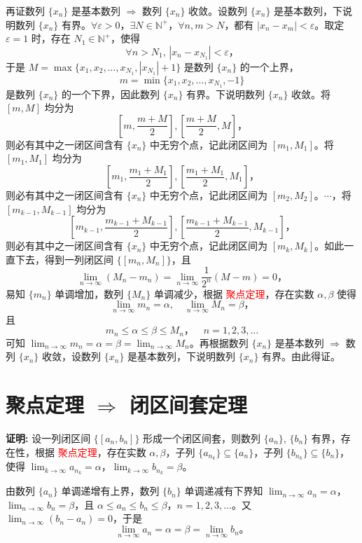 \documentclass[lang=cn,newtx,10pt,scheme=chinese]{elegantbook}
\begin{document}
再证数列 $\{x_n\}$ 是基本数列 $\Rightarrow$ 数列 $\{x_n\}$ 收敛。设数列 $\{x_n\}$ 是基本数列，下说明数列 $\{x_n\}$ 有界。$\forall \varepsilon > 0$，$\exists N \in \mathbb{N}^+$，$\forall n, m > N$，都有 $|x_n - x_m| < \varepsilon$。取定 $\varepsilon = 1$ 时，存在 $N_1 \in \mathbb{N}^+$，使得
\[
\forall n > N_1, \, |x_n - x_{N_1}| < \varepsilon，
\]
于是 $M = \max \{x_1, x_2, \ldots, x_{N_1}, |x_{N_1}| + 1\}$ 是数列 $\{x_n\}$ 的一个上界，
\[
m = \min \{x_1, x_2, \ldots, x_{N_1}, -1\}
\]
是数列 $\{x_n\}$ 的一个下界，因此数列 $\{x_n\}$ 有界。下说明数列 $\{x_n\}$ 收敛。将 $[m, M]$ 均分为
\[
\left[m, \frac{m + M}{2}\right], \left[\frac{m + M}{2}, M\right]，
\]
则必有其中之一闭区间含有 $\{x_n\}$ 中无穷个点，记此闭区间为 $[m_1, M_1]$。将 $[m_1, M_1]$ 均分为
\[
\left[m_1, \frac{m_1 + M_1}{2}\right], \left[\frac{m_1 + M_1}{2}, M_1\right]，
\]
则必有其中之一闭区间含有 $\{x_n\}$ 中无穷个点，记此闭区间为 $[m_2, M_2]$。$\cdots$，将 $[m_{k-1}, M_{k-1}]$ 均分为
\[
\left[m_{k-1}, \frac{m_{k-1} + M_{k-1}}{2}\right], \left[\frac{m_{k-1} + M_{k-1}}{2}, M_{k-1}\right]，
\]
则必有其中之一闭区间含有 $\{x_n\}$ 中无穷个点，记此闭区间为 $[m_k, M_k]$。如此一直下去，得到一列闭区间 $\{[m_n, M_n]\}$，且
\[
\lim_{n \to \infty} (M_n - m_n) = \lim_{n \to \infty} \frac{1}{2^n} (M - m) = 0，
\]
易知 $\{m_n\}$ 单调增加，数列 $\{M_n\}$ 单调减少，根据 \textcolor{red}{聚点定理}，存在实数 $\alpha, \beta$ 使得
\[
\lim_{n \to \infty} m_n = \alpha, \quad \lim_{n \to \infty} M_n = \beta，
\]
且
\[
m_n \leq \alpha \leq \beta \leq M_n， \quad n = 1, 2, 3, \ldots
\]
可知 $\lim_{n \to \infty} m_n = \alpha = \beta = \lim_{n \to \infty} M_n$。再根据数列 $\{x_n\}$ 是基本数列 $\Rightarrow$ 数列 $\{x_n\}$ 收敛，设数列 $\{x_n\}$ 是基本数列，下说明数列 $\{x_n\}$ 有界。由此得证。


\section*{聚点定理 $\Rightarrow$ 闭区间套定理}

\textbf{证明:} 设一列闭区间 $\{[a_n, b_n]\}$ 形成一个闭区间套，则数列 $\{a_n\}$, $\{b_n\}$ 有界，存在性，根据 \textcolor{red}{聚点定理}，存在实数 $\alpha, \beta$，子列 $\{a_{n_k}\} \subseteq \{a_n\}$，子列 $\{b_{n_k}\} \subseteq \{b_n\}$，使得 $\lim_{k \to \infty} a_{n_k} = \alpha$，$\lim_{k \to \infty} b_{n_k} = \beta$。

由数列 $\{a_n\}$ 单调递增有上界，数列 $\{b_n\}$ 单调递减有下界知 $\lim_{n \to \infty} a_n = \alpha$，$\lim_{n \to \infty} b_n = \beta$，且 $\alpha \leq a_n \leq b_n \leq \beta$，$n = 1, 2, 3, \ldots$。又 $\lim_{n \to \infty} (b_n - a_n) = 0$，于是
\[
\lim_{n \to \infty} a_n = \alpha = \beta = \lim_{n \to \infty} b_n。
\]
\end{document}
